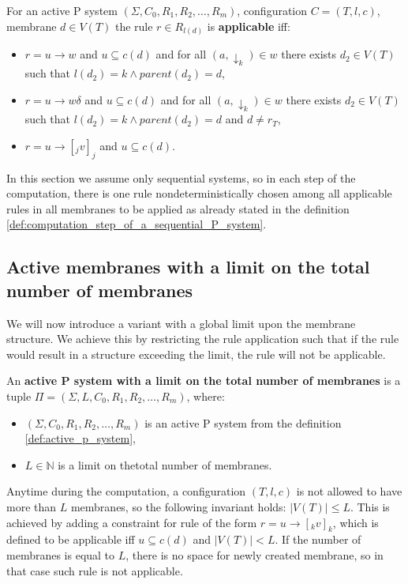 \begin{definition}
  \label{def:applicable_rule_of_active_p_system}
  For an active P system $(\Sigma, C_0, R_1, R_2, \ldots, R_m)$, configuration $C = (T, l, c)$, membrane $d\in V(T)$ the rule $r\in R_{l(d)}$ is {\bf applicable} iff:
  \begin{itemize}
    \item $r = u\rightarrow w$ and $u\subseteq c(d)$ and for all $(a,\downarrow_k)\in w$ there exists $d_2\in V(T)$ such that $l(d_2)=k \wedge parent(d_2) = d$,
    \item $r = u\rightarrow w\delta$ and $u\subseteq c(d)$ and for all $(a,\downarrow_k)\in w$ there exists $d_2\in V(T)$ such that $l(d_2)=k \wedge parent(d_2) = d$ and $d\neq r_T$,
    \item $r = u\rightarrow [_j v]_j$ and $u\subseteq c(d)$.
  \end{itemize}
\end{definition}

In this section we assume only sequential systems, so in each step of the computation, there is one rule nondeterministically chosen among all applicable rules in all membranes to be applied as already stated in the definition \ref{def:computation_step_of_a_sequential_P_system}.


\subsection{Active membranes with a limit on the total number of membranes} %
\label{sub:active_membranes_with_a_limit_on_total_number_of_membranes}

We will now introduce a variant with a global limit upon the membrane structure. We achieve this by restricting the rule application such that if the rule would result in a structure exceeding the limit, the rule will not be applicable.

\begin{definition}
  \label{def:active_p_system_with_a_limit_on_total_number_of_membranes}
  An {\bf active P system with a limit on the total number of membranes} is a tuple $\Pi = (\Sigma, L, C_0, R_1, R_2, \ldots, R_m)$, where:
  \begin{itemize}
    \item $(\Sigma, C_0, R_1, R_2, \ldots, R_m)$ is an active P system from the definition \ref{def:active_p_system},
    \item $L\in \mathbb N$ is a limit on thetotal number of membranes.
  \end{itemize}
\end{definition}
Anytime during the computation, a configuration $(T, l, c)$ is not allowed to have more than $L$ membranes, so the following invariant holds: $|V(T)|\leq L$.
This is achieved by adding a constraint for rule of the form $r = u\rightarrow [_k v]_k$, which is defined to be applicable iff $u\subseteq c(d)$ and $|V(T)|<L$. If the number of membranes is equal to $L$, there is no space for newly created membrane, so in that case such rule is not applicable.

